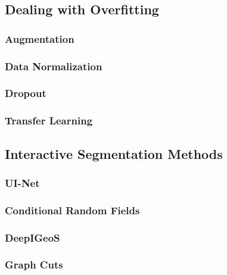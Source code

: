 \subsection{Dealing with Overfitting} \label{sec:overfitting}


\subsubsection{Augmentation} 


\subsubsection{Data Normalization} \label{normSection}


\subsubsection{Dropout}


\subsubsection{Transfer Learning} \label{sec:transferLearn}





\subsection{Interactive Segmentation Methods}


\subsubsection{UI-Net}


\subsubsection{Conditional Random Fields}


\subsubsection{DeepIGeoS} \label{DeepIGeoS}


\subsubsection{Graph Cuts} \label{graphCuts}


